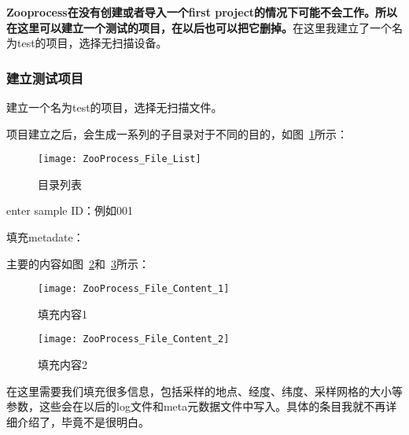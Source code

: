 	\textbf{Zooprocess在没有创建或者导入一个first project的情况下可能不会工作。所以在这里可以建立一个测试的项目，在以后也可以把它删掉。}在这里我建立了一个名为test的项目，选择无扫描设备。
	\subsubsection{建立测试项目}
	建立一个名为test的项目，选择无扫描文件。
	
	项目建立之后，会生成一系列的子目录对于不同的目的，如图~\ref{fig:FileList}所示： 
		\begin{figure}[!ht]
    		\centering
    		\texttt{[image: ZooProcess\_File\_List]}
    		\caption{目录列表}
    		\label{fig:FileList}
    		\end{figure}
		
		enter sample ID：例如001

		填充metadate：

		主要的内容如图~\ref{fig:FileContent1}和~\ref{fig:FileContent2}所示：
		\begin{figure}[!ht]
    		\centering
    		\texttt{[image: ZooProcess\_File\_Content\_1]}
    		\caption{填充内容1}
    		\label{fig:FileContent1}
    		\end{figure}
		
		\begin{figure}[!ht]
    		\centering
    		\texttt{[image: ZooProcess\_File\_Content\_2]}
    		\caption{填充内容2}
    		\label{fig:FileContent2}
    		\end{figure}
		在这里需要我们填充很多信息，包括采样的地点、经度、纬度、采样网格的大小等参数，这些会在以后的log文件和meta元数据文件中写入。具体的条目我就不再详细介绍了，毕竟不是很明白。
